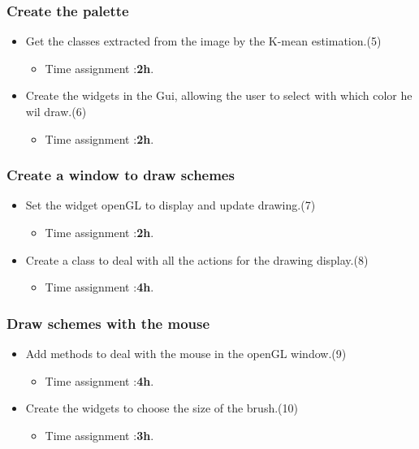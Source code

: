 \documentclass[12pt]{article}
\begin{document}
\subsubsection{\textbf{Create the palette}}
\begin{itemize}
	\item Get the classes extracted from the image by the K-mean estimation.(5)
	      \begin{itemize}
	      	\item Time assignment :\textbf{2h}.
	      \end{itemize}
        \item Create the widgets in the Gui, allowing the user to select with which color he wil draw.(6)
	      \begin{itemize}
	      	\item Time assignment :\textbf{2h}.
	      \end{itemize}
\end{itemize}
\medbreak
\subsubsection{\textbf{Create a window to draw schemes}}
\begin{itemize}
	\item Set the widget openGL to display and update drawing.(7)
	      \begin{itemize}
	      	\item Time assignment :\textbf{2h}.
	      \end{itemize}
        \item Create a class to deal with all the actions for the drawing display.(8)
	      \begin{itemize}
	      	\item Time assignment :\textbf{4h}.
	      \end{itemize}
\end{itemize}
\medbreak
\subsubsection{\textbf{Draw schemes with the mouse}}
\begin{itemize}
	\item Add methods to deal with the mouse in the openGL window.(9)
	      \begin{itemize}
	      	\item Time assignment :\textbf{4h}.
	      \end{itemize}
        \item Create the widgets to choose the size of the brush.(10)
	      \begin{itemize}
	      	\item Time assignment :\textbf{3h}.
	      \end{itemize}
\end{itemize}
\medbreak
\end{document}
